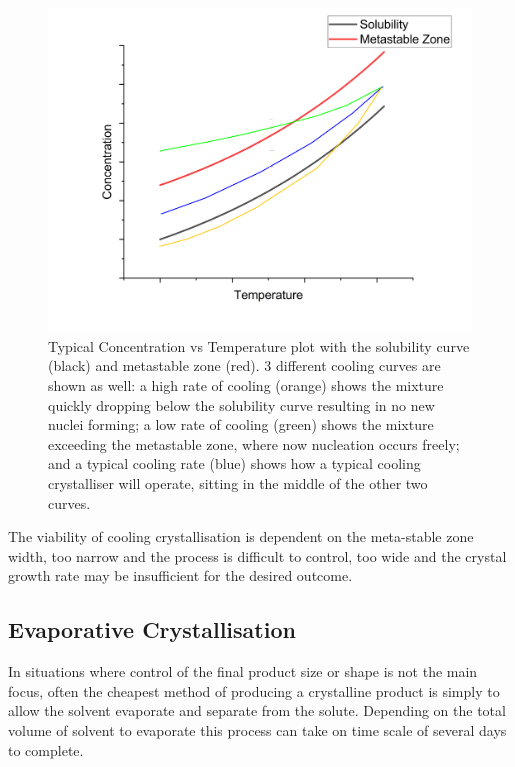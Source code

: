 \begin{figure}[h!]
	\includegraphics[width=\linewidth]{MSZW.png}
	\caption{Typical Concentration vs Temperature plot with the solubility curve (black) and metastable zone (red). 3 different cooling curves are shown as well: a high rate of cooling (orange) shows the mixture quickly dropping below the solubility curve resulting in no new nuclei forming; a low rate of cooling (green) shows the mixture exceeding the metastable zone, where now nucleation occurs freely; and a typical cooling rate (blue) shows how a typical cooling crystalliser will operate, sitting in the middle of the other two curves.}
	\label{fig:MSZW}
\end{figure}

The viability of cooling crystallisation is dependent on the meta-stable 
zone width, too narrow and the process is difficult to control, too wide 
and the crystal growth rate may be insufficient for the desired outcome.

\subsection{Evaporative Crystallisation}
In situations where control of the final product size or shape is not the main
focus, often the cheapest method of producing a crystalline product is simply
to allow the solvent evaporate and separate from the solute. Depending on the 
total volume of solvent to evaporate this process can take on time scale of 
several days to complete.

